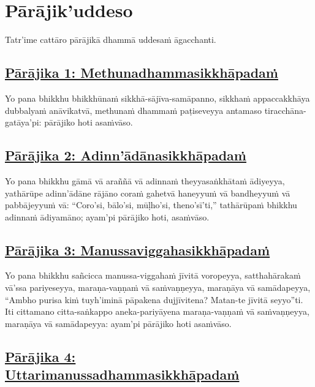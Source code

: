 \section{Pārājik'uddeso}
\label{par}

\begin{intro}
  Tatr'ime cattāro pārājikā dhammā uddesaṁ āgacchanti.
\end{intro}

\setsubsecheadstyle{\subsubsectionFmt}
\subsection*{\hyperref[disq1]{Pārājika 1: Methunadhammasikkhāpadaṁ}}
\label{par1}

Yo pana bhikkhu bhikkhūnaṁ sikkhā-sājīva-samāpanno, sikkhaṁ appaccakkhāya dubbalyaṁ anāvikatvā, methunaṁ dhammaṁ paṭiseveyya antamaso tiracchāna-gatāya'pi: pārājiko hoti asaṁvāso.

\subsection*{\hyperref[disq2]{Pārājika 2: Adinn'ādānasikkhāpadaṁ}}
\label{par2}

Yo pana bhikkhu gāmā vā araññā vā adinnaṁ theyyasaṅkhātaṁ ādiyeyya, yathārūpe adinn'ādāne rājāno coraṁ gahetvā haneyyuṁ vā bandheyyuṁ vā pabbājeyyuṁ vā: ``Coro'si, bālo'si, mūḷho'si, theno'sī'ti,'' tathārūpaṁ bhikkhu adinnaṁ ādiyamāno; ayam'pi pārājiko hoti, asaṁvāso.

\subsection*{\hyperref[disq3]{Pārājika 3: Manussaviggahasikkhāpadaṁ}}
\label{par3}

Yo pana bhikkhu sañcicca manussa-viggahaṁ jīvitā voropeyya, satthahārakaṁ vā'ssa pariyeseyya, maraṇa-vaṇṇaṁ vā saṁvaṇṇeyya, maraṇāya vā samādapeyya, “Ambho purisa kiṁ tuyh'iminā pāpakena dujjīvitena? Matan-te jīvitā seyyo”ti. Iti cittamano citta-saṅkappo aneka-pariyāyena maraṇa-vaṇṇaṁ vā saṁvaṇṇeyya, maraṇāya vā samādapeyya: ayam'pi pārājiko hoti asaṁvāso.

\subsection*{\hyperref[disq4]{Pārājika 4: Uttarimanussadhammasikkhāpadaṁ}}
\label{par4}

